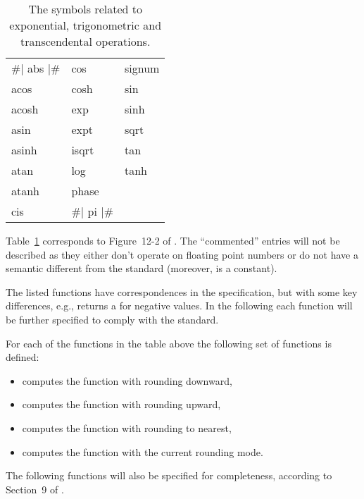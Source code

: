 \documentclass[../../Operations.tex]{subfiles}
\begin{document}
\label{sect:transc-ops}

\begin{table}[ht!]
  \centering
  \begin{tt}
  \begin{tabular}{lll}
    \#| abs |\# & cos & signum\\
    acos &  cosh &  sin\\
    acosh & exp  &  sinh\\
    asin &  expt &  sqrt\\
    asinh & isqrt &  tan\\
    atan &  log &   tanh\\
    atanh & phase & \\
    cis & \#| pi |\# & \\
  \end{tabular}
  \end{tt}
  \caption{The \CL{} symbols related to exponential,
  trigonometric and transcendental operations.}
  \label{table:cl-exptrig-symbols}
\end{table}

\vspace*{3mm}

\noindent
Table~\ref{table:cl-exptrig-symbols} corresponds to Figure~12-2 of \cite{1996:ANSIHyperSpec}.
The ``commented'' entries will not be described as they either don't
operate on floating point numbers or do not have a semantic different
from the \CL{} standard (moreover,  is a constant).

\noindent
The listed \CL{} functions have correspondences in the \cite{2008:IEEE-754}
specification, but with some key differences, e.g.,  returns
a  for negative values.  In the following each
function will be further specified to comply with the \cite{2008:IEEE-754}
standard.


\noindent
For each of the functions in the table above the following set of functions is
defined:
\begin{itemize}
\item \textit{} computes the function with rounding downward,
\item \textit{} computes the function with rounding upward,
\item \textit{} computes the function with rounding to nearest,
\item \textit{} computes the function with the current rounding mode.
\end{itemize}

\vspace*{3mm}

The following functions will also be specified for completeness,
according to Section~9 of \cite{2008:IEEE-754}.









\end{document}
